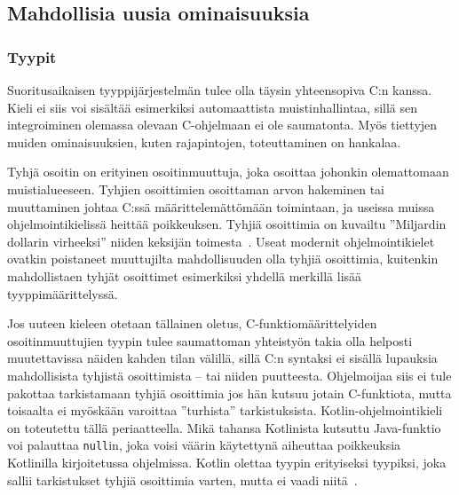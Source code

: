 \FloatBarrier

\subsection{Mahdollisia uusia ominaisuuksia}

\subsubsection{Tyypit}

Suoritusaikaisen tyyppijärjestelmän tulee olla täysin yhteensopiva C:n kanssa.
Kieli ei siis voi sisältää esimerkiksi automaattista muistinhallintaa, sillä
sen integroiminen olemassa olevaan C-ohjelmaan ei ole saumatonta. Myös
tiettyjen muiden ominaisuuksien, kuten rajapintojen, toteuttaminen on hankalaa.

Tyhjä osoitin on erityinen osoitinmuuttuja, joka osoittaa
johonkin olemattomaan muistialueeseen. Tyhjien osoittimien osoittaman arvon
hakeminen tai muuttaminen johtaa C:ssä määrittelemättömään toimintaan, ja
useissa muissa ohjelmointikielissä heittää poikkeuksen. Tyhjiä osoittimia on
kuvailtu ''Miljardin dollarin virheeksi'' niiden keksijän
toimesta~\citep{billiondollars}. Useat modernit ohjelmointikielet ovatkin
poistaneet muuttujilta mahdollisuuden olla tyhjiä osoittimia, kuitenkin
mahdollistaen tyhjät osoittimet esimerkiksi yhdellä merkillä lisää
tyyppimäärittelyssä.

Jos uuteen kieleen otetaan tällainen oletus, C-funktiomäärittelyiden
osoitinmuuttujien tyypin tulee saumattoman yhteistyön takia olla helposti
muutettavissa näiden kahden tilan välillä, sillä C:n syntaksi ei sisällä
lupauksia mahdollisista tyhjistä osoittimista -- tai niiden puutteesta.
Ohjelmoijaa siis ei tule pakottaa tarkistamaan tyhjiä osoittimia jos hän kutsuu
jotain C-funktiota, mutta toisaalta ei myöskään varoittaa ''turhista''
tarkistuksista. Kotlin-ohjelmointikieli~\citep{kotlin} on toteutettu tällä
periaatteella. Mikä tahansa Kotlinista kutsuttu Java-funktio voi palauttaa
\texttt{null}in, joka voisi väärin käytettynä aiheuttaa poikkeuksia Kotlinilla
kirjoitetussa ohjelmissa. Kotlin olettaa tyypin erityiseksi tyypiksi, joka
sallii tarkistukset tyhjiä osoittimia varten, mutta ei vaadi
niitä~\citep{kotlinnullability}.


